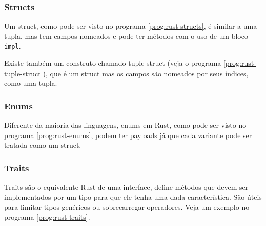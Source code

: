 \subsubsection{Structs}

Um struct, como pode ser visto no programa \ref{prog:rust-structs}, é similar a uma tupla, mas tem campos nomeados e pode ter métodos com o uso de um bloco \texttt{impl}.

\begin{program}
  
  \caption{Definição e uso de structs.\label{prog:rust-structs}}
\end{program}

Existe também um construto chamado tuple-struct (veja o programa \ref{prog:rust-tuple-struct}), que é um struct mas os campos são nomeados por seus índices, como uma tupla.

\begin{program}
  
  \caption{Tuple-struct.\label{prog:rust-tuple-struct}}
\end{program}

\subsubsection{Enums}

Diferente da maioria das linguagens, enums em Rust, como pode ser visto no programa \ref{prog:rust-enums}, podem ter payloads já que cada variante pode ser tratada como um struct.

\begin{program}
  
  \caption{Enums com payloads.\label{prog:rust-enums}}
\end{program}

\subsubsection{Traits}

Traits são o equivalente Rust de uma interface, define métodos que devem ser implementados por um tipo para que ele tenha uma dada característica. São úteis para limitar tipos genéricos ou sobrecarregar operadores. Veja um exemplo no programa \ref{prog:rust-traits}.

\begin{program}
  
  \caption{Implementação de traits.\label{prog:rust-traits}}
\end{program}

